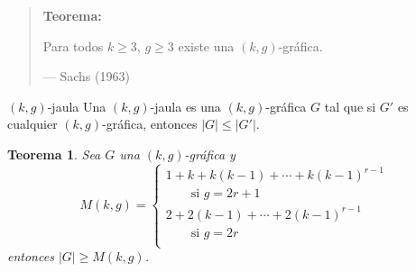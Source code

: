 \documentclass[spanish]{beamer}
\newcommand{\graphcaption}[4][gray!80!white]{\draw (#2,#3) node [fill=#1]{#4};}
\renewcommand{\(}{\bigl(}
\renewcommand{\)}{\bigr)}
\newtheorem{teorema}{Teorema}
\theoremstyle{definition}
\begin{document}
\begin{frame}
  \centering
  \begin{minipage}{0.45\linewidth}
    \begin{center}
    \end{center}
  \end{minipage}
  \pause
  \begin{minipage}{0.45\linewidth}
    \begin{center}
    \end{center}
  \end{minipage}
\end{frame}

\begin{frame}
  \begin{quote}
    \textbf{Teorema:}
    
    Para todos $k\geq3$, $g\geq3$ existe una $(k,g)$-gráfica.

    \hfill--- Sachs (1963)
  \end{quote}
\end{frame}

\begin{defnframe}{$(k,g)$-jaula}
    Una \alert{$(k,g)$-jaula} es una $(k,g)$-gráfica $G$ tal que si
    $G'$ es cualquier $(k,g)$-gráfica, entonces $|G|\leq |G'|$.  
\end{defnframe}

\begin{frame}
  \begin{teorema}
    Sea $G$ una $(k,g)$-gráfica y
    \begin{equation*}
      M(k,g)=
      \begin{cases}
        1+k+k(k-1)+\cdots+k(k-1)^{r-1}\\
        \qquad\text{si $g=2r+1$}\\
        2+2(k-1)+\cdots+2(k-1)^{r-1}\\ \qquad\text{si $g=2r$}\\
      \end{cases}
    \end{equation*}
    entonces $|G|\geq M(k,g)$.
  \end{teorema}
\end{frame}
\end{document}
